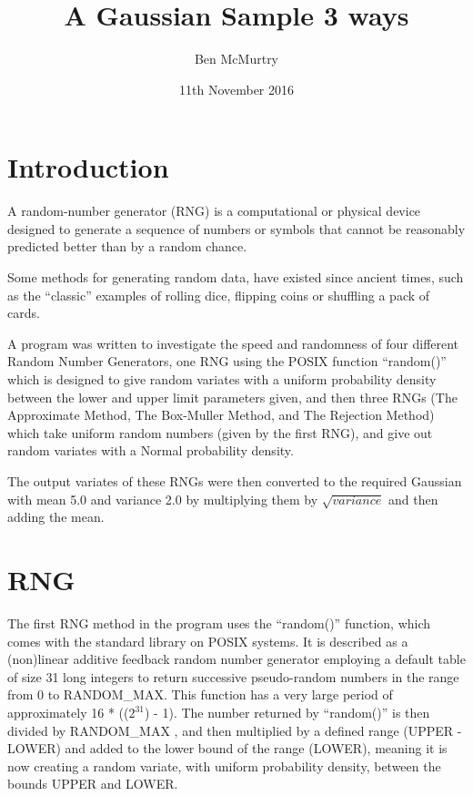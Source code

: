 \documentclass{article}
\begin{document}
\title{A Gaussian Sample 3 ways} 
\author{Ben McMurtry}
\date{11th November 2016} 	
\maketitle





\section{Introduction}
\label{sec:introduction}

A random-number generator (RNG) is a computational or physical device designed to generate a sequence of numbers or symbols that cannot be reasonably predicted better than by a random chance\cite{RNG}.

Some methods for generating random data, have existed since ancient times, such as the ``classic'' examples of rolling dice, flipping coins  or  shuffling a pack of cards.

A program was written to investigate the speed and randomness of four different Random Number Generators, one RNG using the POSIX function ``random()'' which is designed to give random variates with a uniform probability density between the lower and upper limit parameters given, and then three RNGs (The Approximate Method, The Box-Muller Method, and The Rejection Method) which take uniform random numbers (given by the first RNG), and give out random variates with a Normal probability density. 

The output variates of these RNGs were then converted to the required Gaussian with mean 5.0 and variance 2.0 by multiplying them by $\sqrt{variance}$ and then adding the mean.





\section{RNG}

The first RNG method in the program uses the ``random()'' function, which comes with the standard library on POSIX systems. It is described as a (non)linear additive feedback random number generator employing a default table of size 31 long integers to return successive pseudo-random numbers in the range from 0 to RANDOM\_MAX\cite{Random}.  This function has a very large period of approximately 16 * (($2^{31}$) - 1). The number returned by ``random()'' is then divided by RANDOM\_MAX , and then multiplied by a defined range (UPPER - LOWER) and added to the lower bound of the range (LOWER), meaning it is now creating a random variate, with uniform probability density, between the bounds UPPER and LOWER. 
\end{document}
